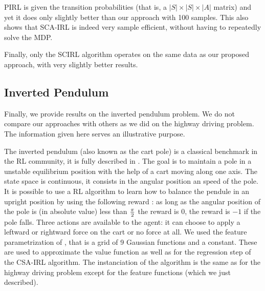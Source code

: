 \documentclass[smallextended]{svjour3}
\begin{document}
PIRL is given the transition probabilities (that is, a $|S|\times |S|\times |A|$ matrix) and yet it does only slightly better than our approach with 100 samples. This also shows that SCA-IRL is indeed very sample efficient, without having to repeatedly solve the MDP.

Finally, only the SCIRL algorithm operates on the same data as our proposed approach, with very slightly better results.

\subsection{Inverted Pendulum}
\label{subsec:IP}
Finally, we provide results on the inverted pendulum problem. We do not compare our approaches with others as we did on the highway driving problem. The information given here serves an illustrative purpose.

The inverted pendulum (also known as the cart pole) is a classical benchmark in the RL community, it is fully described in \cite{lagoudakis2003least}. The goal is to maintain a pole in a unstable equilibrium position with the help of a cart moving along one axis. The state space is continuous, it consists in the angular position an speed of the pole. It is possible to use a RL algorithm to learn how to balance the pendule in an upright position by using the following reward : as long as the angular position of the pole is (in absolute value) less than $\pi \over 2$ the reward is $0$, the reward is $-1$ if the pole falls. Three actions are available to the agent: it can choose to apply a leftward or rightward force on the cart or no force at all. We used the feature parametrization of \cite{lagoudakis2003least}, that is a grid of 9 Gaussian functions and a constant. These are used to approximate the value function as well as for the regression step of the CSA-IRL algorithm. The instanciation of the algorithm is the same as for the highway driving problem except for the feature functions (which we just described). 
\end{document}
